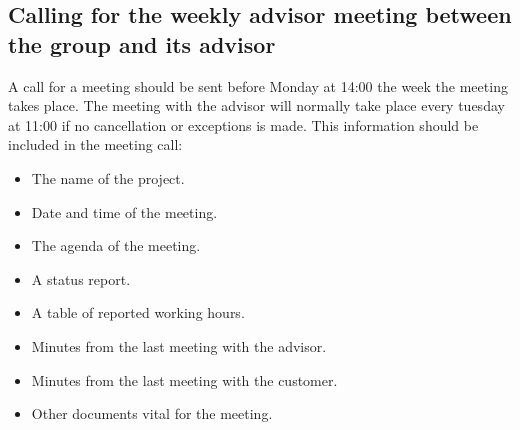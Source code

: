 \subsection{Calling for the weekly advisor meeting between the group and its advisor}
A call for a meeting should be sent before Monday at 14:00 the week the meeting takes place. The meeting with the advisor will normally take place every tuesday at 11:00 if no cancellation or exceptions is made.
\newline
\newline
This information should be included in the meeting call:
\begin{itemize}
\item{}The name of the project.
\item{}Date and time of the meeting.
\item{}The agenda of the meeting.
\item{}A status report.
\item{}A table of reported working hours.
\item{}Minutes from the last meeting with the advisor.
\item{}Minutes from the last meeting with the customer.
\item{}Other documents vital for the meeting.
\end{itemize}

